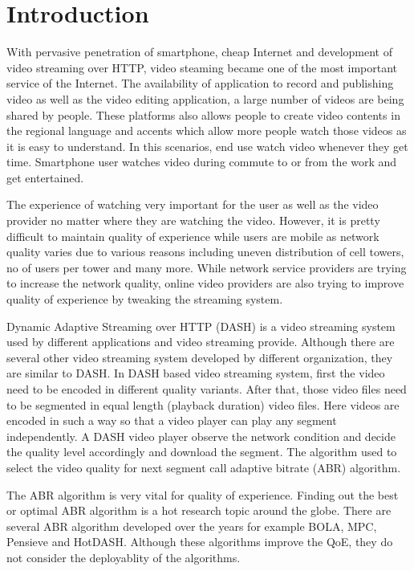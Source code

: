 \section{Introduction}
With pervasive penetration of smartphone, cheap Internet and development of video streaming over HTTP, video steaming became one of the most important service of the Internet. The availability of application to record and publishing video as well as the video editing application, a large number of videos are being shared by people. These platforms also allows people to create video contents in the regional language and accents which allow more people watch those videos as it is easy to understand. In this scenarios, end use watch video whenever they get time. Smartphone user watches video during commute to or from the work and get entertained.

The experience of watching very important for the user as well as the video provider no matter where they are watching the video. However, it is pretty difficult to maintain quality of experience while users are mobile as network quality varies due to various reasons including uneven distribution of cell towers, no of users per tower and many more. While network service providers are trying to increase the network quality, online video providers are also trying to improve quality of experience by tweaking the streaming system.

Dynamic Adaptive Streaming over HTTP (DASH) is a video streaming system used by different applications and video streaming provide. Although there are several other video streaming system developed by different organization, they are similar to DASH. In DASH based video streaming system, first the video need to be encoded in different quality variants. After that, those video files need to be segmented in equal length (playback duration) video files. Here videos are encoded in such a way so that a video player can play any segment independently. A DASH video player observe the network condition and decide the quality level accordingly and download the segment. The algorithm used to select the video quality for next segment call adaptive bitrate (ABR) algorithm.

The ABR algorithm is very vital for quality of experience. Finding out the best or optimal ABR algorithm is a hot research topic around the globe. There are several ABR algorithm developed over the years for example BOLA, MPC, Pensieve and HotDASH. Although these algorithms improve the QoE, they do not consider the deployablity of the algorithms.

